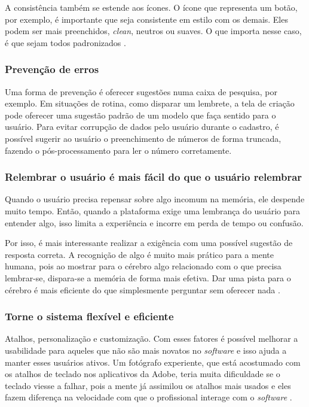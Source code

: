 A consistência também se estende aos ícones. O ícone que representa um botão, por exemplo, é importante que seja consistente em estilo com os demais. Eles podem ser mais preenchidos, \textit{clean}, neutros ou suaves. O que importa nesse caso, é que sejam todos padronizados \cite{site:nielsenIcon}.


\subsubsection{Prevenção de erros}

Uma forma de prevenção é oferecer sugestões numa caixa de pesquisa, por exemplo. Em situações de rotina, como disparar um lembrete, a tela de criação pode oferecer uma sugestão padrão de um modelo que faça sentido para o usuário. Para evitar corrupção de dados pelo usuário durante o cadastro, é possível sugerir ao usuário o preenchimento de números de forma truncada, fazendo o pós-processamento para ler o número corretamente.

\subsubsection{Relembrar o usuário é mais fácil do que o usuário relembrar}

Quando o usuário precisa repensar sobre algo incomum na memória, ele despende muito tempo. Então, quando a plataforma exige uma lembrança do usuário para entender algo, isso limita a experiência e incorre em perda de tempo ou confusão.

Por isso, é mais interessante realizar a exigência com uma possível sugestão de resposta correta. A recognição de algo é muito mais prático para a mente humana, pois ao mostrar para o cérebro algo relacionado com o que precisa lembrar-se, dispara-se a memória de forma mais efetiva. Dar uma pista para o cérebro é mais eficiente do que simplesmente perguntar sem oferecer nada \cite{site:nielsenRecall}.

\subsubsection{Torne o sistema flexível e eficiente}

Atalhos, personalização e customização. Com esses fatores é possível melhorar a usabilidade para aqueles que não são mais novatos no \textit{software} e isso ajuda a manter esses usuários ativos. Um fotógrafo experiente, que está acostumado com os atalhos de teclado nos aplicativos da Adobe, teria muita dificuldade se o teclado viesse a falhar, pois a mente já assimilou os atalhos mais usados e eles fazem diferença na velocidade com que o profissional interage com o \textit{software} \cite{site:nielsenFlexibility}.

